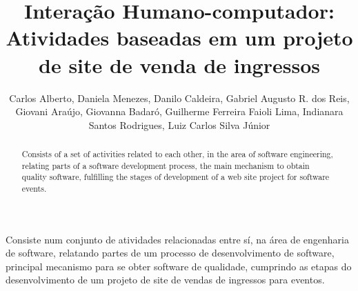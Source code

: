 \documentclass[12pt]{article}
\title{Interação Humano-computador:\\Atividades baseadas em um projeto de site de venda de ingressos}
\author{
    \begin{minipage}{\textwidth}
        Carlos Alberto\inst{1},
        Daniela Menezes\inst{2},
        Danilo Caldeira\inst{3},
        Gabriel Augusto R. dos Reis\inst{4},
        Giovani Araújo\inst{5},
        Giovanna Badaró\inst{6},
        Guilherme Ferreira Faioli Lima\inst{7},
        Indianara Santos Rodrigues\inst{8},
        Luiz Carlos Silva Júnior\inst{9}
    \end{minipage}
}
\begin{document}
 

\maketitle

\begin{abstract}
Consists of a set of activities related to each other, in the area of software engineering, relating parts of a software development process, the main mechanism to obtain quality software, fulfilling the stages of development of a web site project for software events.
\end{abstract}
     
\begin{resumo}
Consiste num conjunto de atividades relacionadas entre sí, na área de engenharia de software, relatando partes de um processo de desenvolvimento de software, principal mecanismo para se obter software de qualidade, cumprindo as etapas do desenvolvimento de um projeto de site de vendas de ingressos para eventos.
\end{resumo}

\tableofcontents
\newpage
\end{document}
